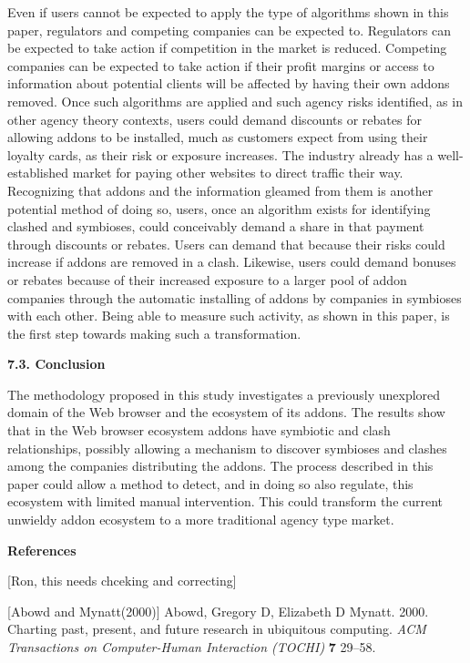 \documentclass{article} %
\begin{document}
 Even if users cannot be expected to apply the type of algorithms shown in this paper, regulators and competing companies can be expected to. Regulators can be expected to take action if competition in the market is reduced. Competing companies can be expected to take action if their profit margins or access to information about potential clients will be affected by having their own addons removed.  Once such algorithms are applied and such agency risks identified, as in other agency theory contexts, users could demand discounts or rebates for allowing addons to be installed, much as customers expect from using their loyalty cards, as their risk or exposure increases. The industry already has a well-established market for paying other websites to direct traffic their way. Recognizing that addons and the information gleamed from them is another potential method of doing so, users, once an algorithm exists for identifying clashed and symbioses, could conceivably demand a share in that payment through discounts or rebates. Users can demand that because their risks could increase if addons are removed in a clash. Likewise, users could demand bonuses or rebates because of their increased exposure to a larger pool of addon companies through the automatic installing of addons by companies in symbioses with each other. Being able to measure such activity, as shown in this paper, is the first step towards making such a transformation. 



\noindent \textbf{7.3. Conclusion}

The methodology proposed in this study investigates a previously unexplored domain of the Web browser and the ecosystem of its addons. The results show that in the Web browser ecosystem addons have symbiotic and clash relationships, possibly allowing a mechanism to discover symbioses and clashes among the companies distributing the addons. The process described in this paper could allow a method to detect, and in doing so also regulate, this ecosystem with limited manual intervention. This could transform the current unwieldy addon ecosystem to a more traditional agency type market. 

\noindent \eject 

\noindent \textbf{References} 

[Ron, this needs chceking and correcting]



[Abowd and Mynatt(2000)]  Abowd, Gregory D, Elizabeth D Mynatt. 2000.    Charting past, present, and future research in ubiquitous computing.    \textit{ ACM Transactions on Computer-Human Interaction (TOCHI)} \textbf{ 7} 29--58.
\end{document}
